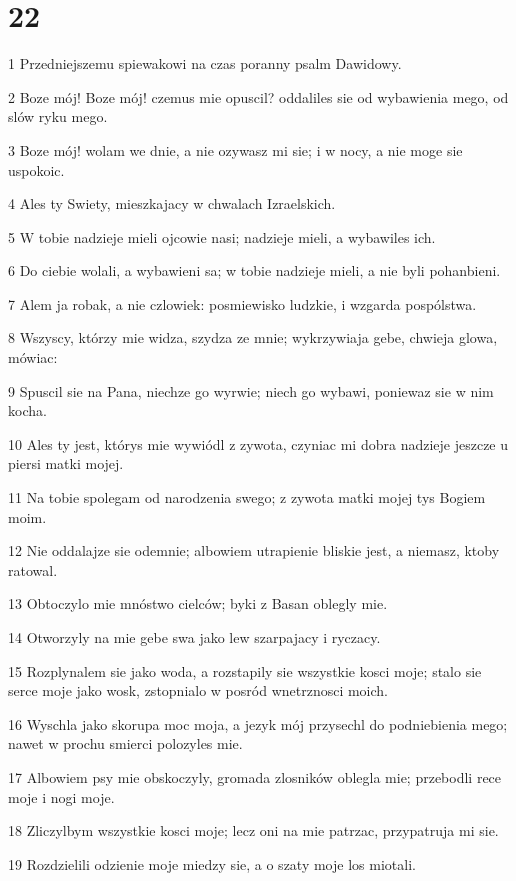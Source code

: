 \chapter{22}

\par 1 Przedniejszemu spiewakowi na czas poranny psalm Dawidowy.
\par 2 Boze mój! Boze mój! czemus mie opuscil? oddaliles sie od wybawienia mego, od slów ryku mego.
\par 3 Boze mój! wolam we dnie, a nie ozywasz mi sie; i w nocy, a nie moge sie uspokoic.
\par 4 Ales ty Swiety, mieszkajacy w chwalach Izraelskich.
\par 5 W tobie nadzieje mieli ojcowie nasi; nadzieje mieli, a wybawiles ich.
\par 6 Do ciebie wolali, a wybawieni sa; w tobie nadzieje mieli, a nie byli pohanbieni.
\par 7 Alem ja robak, a nie czlowiek: posmiewisko ludzkie, i wzgarda pospólstwa.
\par 8 Wszyscy, którzy mie widza, szydza ze mnie; wykrzywiaja gebe, chwieja glowa, mówiac:
\par 9 Spuscil sie na Pana, niechze go wyrwie; niech go wybawi, poniewaz sie w nim kocha.
\par 10 Ales ty jest, którys mie wywiódl z zywota, czyniac mi dobra nadzieje jeszcze u piersi matki mojej.
\par 11 Na tobie spolegam od narodzenia swego; z zywota matki mojej tys Bogiem moim.
\par 12 Nie oddalajze sie odemnie; albowiem utrapienie bliskie jest, a niemasz, ktoby ratowal.
\par 13 Obtoczylo mie mnóstwo cielców; byki z Basan oblegly mie.
\par 14 Otworzyly na mie gebe swa jako lew szarpajacy i ryczacy.
\par 15 Rozplynalem sie jako woda, a rozstapily sie wszystkie kosci moje; stalo sie serce moje jako wosk, zstopnialo w posród wnetrznosci moich.
\par 16 Wyschla jako skorupa moc moja, a jezyk mój przysechl do podniebienia mego; nawet w prochu smierci polozyles mie.
\par 17 Albowiem psy mie obskoczyly, gromada zlosników oblegla mie; przebodli rece moje i nogi moje.
\par 18 Zliczylbym wszystkie kosci moje; lecz oni na mie patrzac, przypatruja mi sie.
\par 19 Rozdzielili odzienie moje miedzy sie, a o szaty moje los miotali.
